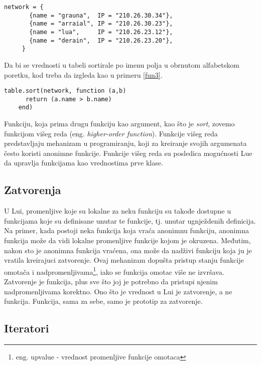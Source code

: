 \documentclass[a4paper]{article}
\begin{document}
\begin{lstlisting}[caption={Primer tabele \cite{bookProgInLua}},frame=single, label=fun2]
     network = {
       {name = "grauna",  IP = "210.26.30.34"},
       {name = "arraial", IP = "210.26.30.23"},
       {name = "lua",     IP = "210.26.23.12"},
       {name = "derain",  IP = "210.26.23.20"},
     }
\end{lstlisting}
Da bi se vrednosti u tabeli sortirale po imenu polja u obrnutom alfabetskom poretku, kod treba da izgleda kao u primeru \ref{fun3}.
\begin{lstlisting}[caption={Sortiranje vrednosti tabele \cite{bookProgInLua}},frame=single, label=fun3]
    table.sort(network, function (a,b)
      return (a.name > b.name)
    end)
\end{lstlisting}
Funkciju, koja prima drugu funkciju kao argument, kao što je \textit{sort}, zovemo funkcijom višeg reda (eng. \textit{higher-order function}). Funkcije višeg reda predstavljaju mehanizam u programiranju, koji za kreiranje svojih argumenata često koristi anonimne funkcije. Funkcije višeg reda su posledica mogućnosti Lue da upravlja funkcijama kao vrednostima prve klase.



\subsection{Zatvorenja}
\label{sec:zatvorenja}


U Lui, promenljive koje su lokalne za neku funkciju su takođe dostupne u funkcijama koje su definisane unutar te funkcije, tj. unutar ugnježdenih definicija. Na primer, kada postoji neka funkcija koja vraća anonimnu funkciju, anonimna funkcija može da vidi lokalne promenljive funkcije kojom je okruzena. Međutim, nakon sto je anonimna funkcija vraćena, ona može da nadživi funkciju koja ju je vratila kreirajuci zatvorenje. Ovaj mehanizam dopušta pristup stanju funkcije omotača i nadpromenljivama\footnote{eng. upvalue - vrednost promenljive funkcije omotaca}, iako se funkcija omotac više ne izvršava.
Zatvorenje je funkcija, plus sve što joj je potrebno da pristupi njenim nadpromenljivama korektno. Ono što je vrednost u Lui je zatvorenje, a ne funkcija. Funkcija, sama za sebe, samo je prototip za zatvorenje.


\subsection{Iteratori}
\label{sec:iteratori}
\end{document}
